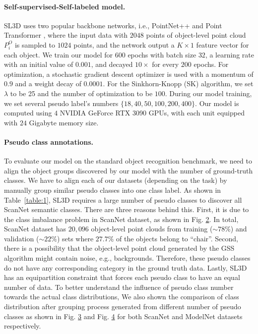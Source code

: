 \documentclass{article}
\begin{document}
\paragraph{Self-supervised-Self-labeled model. } SL3D uses two popular backbone networks, i.e., PointNet++ \cite{qi2017pointnetplusplus} and Point Transformer \cite{zhao2021point}, where the input data with $2048$ points of object-level point cloud $P^O_{i}$ is sampled to $1024$ points, and the network output a $K\times 1$ feature vector for each object. We train our model for $600$ epochs with batch size $32$, a learning rate with an initial value of $0.001$, and decayed $10\times$ for every $200$ epochs. 
For optimization, a stochastic gradient descent optimizer is used with a momentum of $0.9$ and a weight decay of $0.0001$. For the Sinkhorn-Knopp (SK) algorithm, we set $\lambda$  to be 25 and the number of optimization to be $100$. During our model training, we set several pseudo label's numbers $\{18, 40, 50, 100, 200, 400\}$. Our model is computed using $4$ NVIDIA GeForce RTX 3090 GPUs, with each unit equipped with $24$ Gigabyte memory size. 

\paragraph{Pseudo class annotations. }To evaluate our model on the  standard object recognition benchmark, we need to align the object groups discovered by our model with the number of ground-truth classes. We have to align each of our datasets (depending on the task) by manually group similar pseudo classes into one class label. 
As shown in Table~\ref{table:1}, SL3D requires a large number of pseudo classes to discover all ScanNet semantic classes. There are three reasons behind this. First, it is due to the class imbalance problem in ScanNet dataset, as shown in Fig. \hyperref[wrap-fig:1]{2}. In total, ScanNet dataset has $20,096$ object-level point clouds from training ($\sim78\%$) and validation ($\sim22\%$) sets where $27.7\%$ of the objects belong to ``chair''. Second, there is a possibility that the object-level point cloud generated by the GSS algorithm might contain noise, e.g., backgrounds. Therefore, these pseudo classes do not have any corresponding category in the ground truth data. 
Lastly, SL3D has an equipartition constraint that forces each pseudo class to have an equal number of data. To better understand the influence of pseudo class number towards the actual class distributions, We also shown the comparison of class distribution after grouping process generated from different number of pseudo classes as shown in Fig. \hyperref[fig:3]{3} and Fig. \hyperref[fig:4]{4} for both ScanNet and ModelNet datasets respectively.
\end{document}

